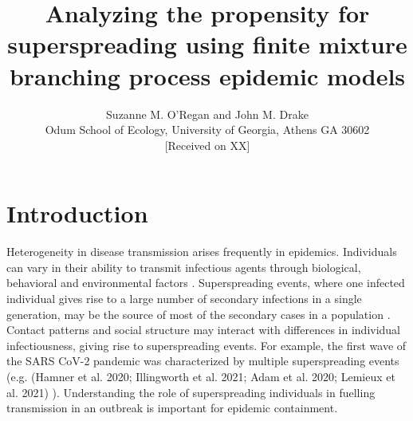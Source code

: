 \documentclass{imammb}
\numberwithin{equation}{section}
\begin{document}
\title{Analyzing the propensity for superspreading using finite mixture branching process epidemic models}
\author{ {\sc Suzanne M. O’Regan and John M. Drake}\\[2pt]
Odum School of Ecology, University of Georgia, Athens GA 30602\\[6pt]
{\rm [Received on XX]}\vspace*{6pt}}
\pagestyle{headings}
\maketitle







\section{Introduction}
Heterogeneity in disease transmission arises frequently in epidemics. Individuals can vary in their ability to transmit infectious agents through biological, behavioral and environmental factors \citep{Lloyd-Smith2005-ma, Althouse2020-dn}. Superspreading events, where one infected individual gives rise to a large number of secondary infections in a single generation, may be the source of most of the secondary cases in a population \citep{Althouse2020-dn}. Contact patterns and social structure may interact with differences in individual infectiousness, giving rise to superspreading events. For example, the first wave of the SARS CoV-2 pandemic was characterized by multiple superspreading events (e.g.\citep{Hamner2020-zt, Adam2020-xk} (Hamner et al. 2020; Illingworth et al. 2021; Adam et al. 2020; Lemieux et al. 2021) ). Understanding the role of superspreading individuals in fuelling transmission in an outbreak is important for epidemic containment. 
\end{document}
